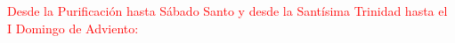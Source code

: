 \documentclass[10pt,twoside]{book}
\begin{document}
\vspace{0.5em}

\textcolor{red}{Desde la Purificación hasta Sábado Santo y desde la Santísima Trinidad hasta el I Domingo de Adviento:}
\vspace{0.2em}
\begin{paracol}{2}
      \begin{leftcolumn}
            
      \end{leftcolumn}
      \begin{otherlanguage}{latin}
            \begin{rightcolumn}
                  
            \end{rightcolumn}
      \end{otherlanguage}


      \begin{leftcolumn*}
            
      \end{leftcolumn*}
      \begin{otherlanguage}{latin}
            \begin{rightcolumn}
                  
            \end{rightcolumn}
      \end{otherlanguage}
\end{paracol}

\vspace{0.5em}
\end{document}

